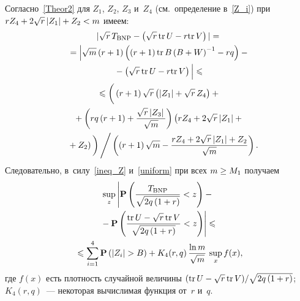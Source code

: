 \begin{multicols}{2}
Согласно~\eqref{Theor2} для $Z_1$, $Z_2$, $Z_3$ и~$Z_4$ (см.\ определение 
в~\eqref{Z_i}) при $rZ_{4}\hm+2\sqrt{r}\left|Z_{1}\right|\hm+Z_{2} \hm< m$ 
имеем:
\begin{multline*}
|\sqrt{r}\,T_{\mathrm{BNP}} - \left(\sqrt{r}\,\mathrm{tr}\,{U}-r\mathrm{tr}\,{V}\right)|={}\\
{}= \left|\sqrt{m}\left(r+1\right)\left(\left(r+1\right)\mathrm{tr}\,{B\left(B+W\right)^{-1}}
-rq\right)-{}\right.\\
\left.{}-\left(\sqrt{r}\,\mathrm{tr}\,{U}-r\mathrm{tr}\,{V}\right)
\vphantom{\left(W\right)^{-1}}
\right|\leqslant{}\\
{}\leqslant
  \left( 
   \vphantom{\fr{\sqrt{r}}{\sqrt{v}}}
   \left(r+1\right)\sqrt{r}\left(\left|Z_{1}\right|+\sqrt{r}\,Z_{4}\right)+{}\right.
 \\
 {}+     \left(
\vphantom{\fr{\sqrt{r}\left|Z_{3}\right|}{\sqrt{m}}}
    rq\left(r+1\right)+\fr{\sqrt{r}\left|Z_{3}\right|}{\sqrt{m}}\right)\left(rZ_{4}+
2\sqrt{r}\left|Z_{1}\right|+{}\right.\\
\left.\left.{}+Z_{2}\right)
\vphantom{\fr{\sqrt{r}}{\sqrt{v}}}
\right)\Bigg/
    \left( \left(r+1\right)\sqrt{m}-
\fr{rZ_{4}+2\sqrt{r}\left|Z_{1}\right|+Z_{2}}{\sqrt{m}}\right).\hspace*{-6.32483pt}
\end{multline*}
Следовательно, в~силу~\eqref{ineq_Z} и~\eqref{uniform} при всех $m\hm\geq M_1$ 
получаем
\begin{multline}
\label{interm}
\mathop{\sup}\limits_{z}\left|\mathbf{P}\left (\fr{T_{\mathrm{BNP}}}
{\sqrt{2q\left(1+r\right)}}<z\right)-{}\right.\\
\left.{}-
\mathbf{P}\left(\fr{\mathrm{tr}\,{U}-\sqrt{r}\,\mathrm{tr}\,{V}}{\sqrt{2q\left(1+r\right)}} < z 
\right)\right| \leqslant{}\\
{}\leqslant \sum\limits_{i=1}^{4} \mathbf{P}\left(|Z_i|> B\right) +  K_{4}(r, q)\,
\fr{\ln m}{\sqrt{m}}\, \sup\limits_{x}{f(x)},
\end{multline}
где $f(x)$ есть плотность случайной величины ${(\mathrm{tr}\,{U}\hm-
\sqrt{r}\,\mathrm{tr}\,{V})}/{\sqrt{2q\left(1\hm+r\right)}}$;
$K_{4}\left(r, q\right)$~--- 
некоторая вычислимая функция от~$r$ и~$q$.


\end{multicols}
